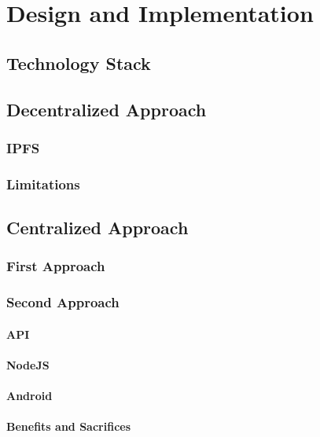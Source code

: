 
\chapter{Design and Implementation}\label{chapter:design}
\section{Technology Stack}
\section{Decentralized Approach}
\subsection{IPFS}
\subsection{Limitations}
\section{Centralized Approach}
\subsection{First Approach}
\subsection{Second Approach}
\subsubsection{API}
\subsubsection{NodeJS}
\subsubsection{Android}
\subsubsection{Benefits and Sacrifices}